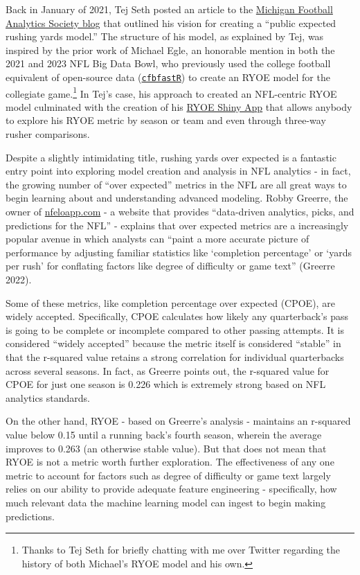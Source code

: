 \documentclass[
  letterpaper,
]{krantz}
\begin{document}
Back in January of 2021, Tej Seth posted an article to the
\href{https://mfootballanalytics.com/2021/01/14/creating-a-public-expected-rushing-yards-model/}{Michigan
Football Analytics Society blog} that outlined his vision for creating a
``public expected rushing yards model.'' The structure of his model, as
explained by Tej, was inspired by the prior work of Michael Egle, an
honorable mention in both the 2021 and 2023 NFL Big Data Bowl, who
previously used the college football equivalent of open-source data
(\href{https://cfbfastr.sportsdataverse.org/}{\texttt{cfbfastR}}) to
create an RYOE model for the collegiate game.\footnote{Thanks to Tej
  Seth for briefly chatting with me over Twitter regarding the history
  of both Michael's RYOE model and his own.} In Tej's case, his approach
to created an NFL-centric RYOE model culminated with the creation of his
\href{https://mfbanalytics.shinyapps.io/RYOE/}{RYOE Shiny App} that
allows anybody to explore his RYOE metric by season or team and even
through three-way rusher comparisons.

Despite a slightly intimidating title, rushing yards over expected is a
fantastic entry point into exploring model creation and analysis in NFL
analytics - in fact, the growing number of ``over expected'' metrics in
the NFL are all great ways to begin learning about and understanding
advanced modeling. Robby Greerre, the owner of
\href{https://www.nfeloapp.com/}{nfeloapp.com} - a website that provides
``data-driven analytics, picks, and predictions for the NFL'' - explains
that over expected metrics are a increasingly popular avenue in which
analysts can ``paint a more accurate picture of performance by adjusting
familiar statistics like `completion percentage' or `yards per rush' for
conflating factors like degree of difficulty or game text'' (Greerre
2022).

Some of these metrics, like completion percentage over expected (CPOE),
are widely accepted. Specifically, CPOE calculates how likely any
quarterback's pass is going to be complete or incomplete compared to
other passing attempts. It is considered ``widely accepted'' because the
metric itself is considered ``stable'' in that the r-squared value
retains a strong correlation for individual quarterbacks across several
seasons. In fact, as Greerre points out, the r-squared value for CPOE
for just one season is 0.226 which is extremely strong based on NFL
analytics standards.

On the other hand, RYOE - based on Greerre's analysis - maintains an
r-squared value below 0.15 until a running back's fourth season, wherein
the average improves to 0.263 (an otherwise stable value). But that does
not mean that RYOE is not a metric worth further exploration. The
effectiveness of any one metric to account for factors such as degree of
difficulty or game text largely relies on our ability to provide
adequate feature engineering - specifically, how much relevant data the
machine learning model can ingest to begin making predictions.
\end{document}

